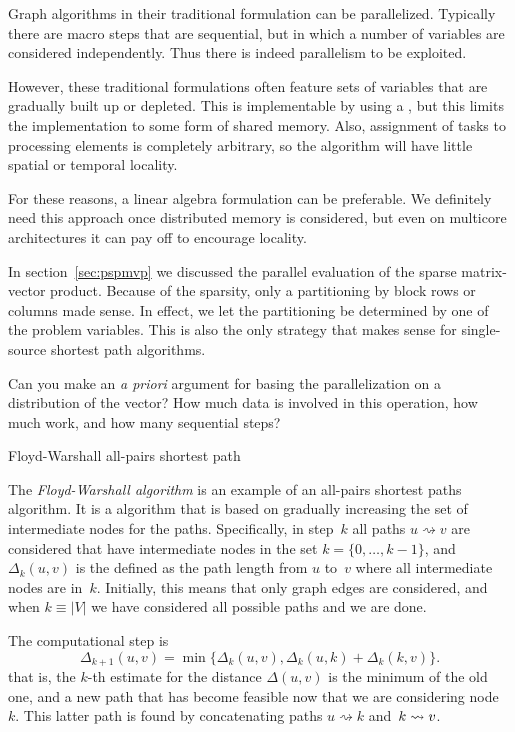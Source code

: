 Graph algorithms in their traditional formulation can be parallelized.
Typically there are macro steps that are sequential, but in which 
a number of variables are considered independently. Thus there is indeed
parallelism to be exploited.

However, these traditional formulations often feature sets of variables
that are gradually built up or depleted. This is implementable by
using a , but this limits the 
implementation to some form of shared memory. Also, assignment of tasks 
to processing elements is completely arbitrary, so the algorithm
will have little spatial or temporal locality.

For these reasons, a linear algebra formulation can be preferable.
We definitely need this approach once distributed memory is considered,
but even on multicore architectures it can pay off to 
encourage locality.

In section~\ref{sec:pspmvp} we discussed the parallel evaluation
of the sparse matrix-vector product. Because of the sparsity, 
only a partitioning by block rows or columns made sense.
In effect, we let the partitioning be determined by one of the problem
variables. This is also the only strategy that makes sense for
single-source shortest path algorithms.

\begin{exercise}
  Can you make an \textit{a priori} argument for basing the
  parallelization on a distribution of the vector? How much data is
  involved in this operation, how much work, and how many sequential
  steps?
\end{exercise}

 {Floyd-Warshall all-pairs shortest path}
\label{sec:floyd}

The \emph{Floyd-Warshall algorithm} is an example of an all-pairs
shortest paths algorithm. It is a 
algorithm that is based on gradually increasing the set of intermediate
nodes for the paths.
Specifically,  in step~$k$ all paths $u\rightsquigarrow v$ are considered 
that have intermediate nodes in the set $k=\{0,\ldots,k-1\}$, and $\Delta_k(u,v)$ 
is the defined as the path length from $u$ to~$v$ where all intermediate nodes
are in~$k$. Initially, this means that only graph edges are considered, and
when $k\equiv |V|$ we have considered all possible paths and we are done.

The computational step is
\begin{equation}
  \Delta_{k+1}(u,v) = \min\bigl\{ \Delta_k(u,v),
  \Delta_k(u,k)+\Delta_k(k,v) \bigr\}.
  \label{eq:floyd-allpairs}
\end{equation}
that is, the $k$-th estimate for the distance $\Delta(u,v)$ is the minimum
of the old one, and a new path that has become feasible now that we
are considering node~$k$. This latter path is found by
concatenating paths $u\rightsquigarrow k$
and~$k\rightsquigarrow\nobreak v$.

